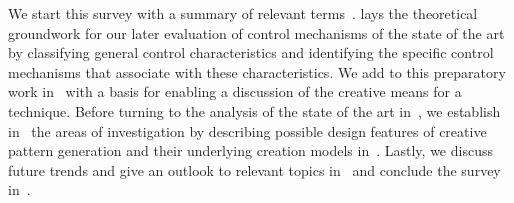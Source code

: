 We start this survey with a summary of relevant terms~.  lays the theoretical groundwork for our later evaluation of control mechanisms of the state of the art by classifying general control characteristics and identifying the specific control mechanisms that associate with these characteristics. We add to this preparatory work in~ with a basis for enabling a discussion of the creative means for a technique. Before turning to the analysis of the state of the art in~, we establish in~ the areas of investigation by describing possible design features of creative pattern generation and their underlying creation models in~. Lastly, we discuss future trends and give an outlook to relevant topics in~ and conclude the survey in~.